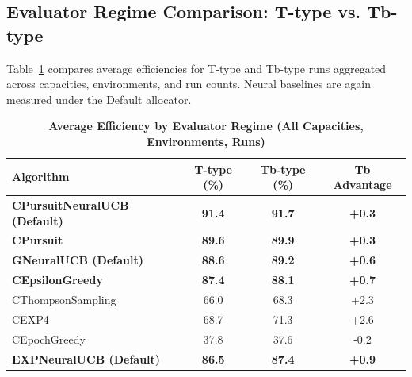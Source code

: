 \documentclass[12pt,a4paper]{article}
\newcommand{\performance}[1]{\textcolor{performancecolor}{\textbf{#1}}}
\newcommand{\legacy}[1]{\textcolor{legacycolor}{\textbf{#1}}}
\newcommand{\neural}[1]{\textcolor{neuralcolor}{\textbf{#1}}}
\begin{document}
\newpage
\subsection{Evaluator Regime Comparison: T-type vs. Tb-type}

Table~\ref{tab:regime-comparison} compares average efficiencies for T-type and Tb-type runs aggregated across capacities, environments, and run counts. Neural baselines are again measured under the Default allocator.

\begin{table}[H]
\centering
\caption{\performance{Average Efficiency by Evaluator Regime (All Capacities, Environments, Runs)}}
\label{tab:regime-comparison}
\begin{tabular}{|l|c|c|c|}
\hline
\textbf{Algorithm} & \textbf{T-type (\%)} & \textbf{Tb-type (\%)} & \textbf{Tb Advantage} \\
\hline
\hline
\neural{CPursuitNeuralUCB (Default)}   & \neural{91.4}     & \neural{91.7}     & \neural{+0.3} \\
\performance{CPursuit}                 & \performance{89.6} & \performance{89.9} & \performance{+0.3} \\
\neural{GNeuralUCB (Default)}          & \neural{88.6}     & \neural{89.2}     & \neural{+0.6} \\
\performance{CEpsilonGreedy}           & \performance{87.4} & \performance{88.1} & \performance{+0.7} \\
CThompsonSampling                      & 66.0              & 68.3              & +2.3 \\
CEXP4                                  & 68.7              & 71.3              & +2.6 \\
CEpochGreedy                           & 37.8              & 37.6              & -0.2 \\
\legacy{EXPNeuralUCB (Default)}        & \legacy{86.5}     & \legacy{87.4}     & \legacy{+0.9} \\
\hline
\end{tabular}
\end{table}
\end{document}
